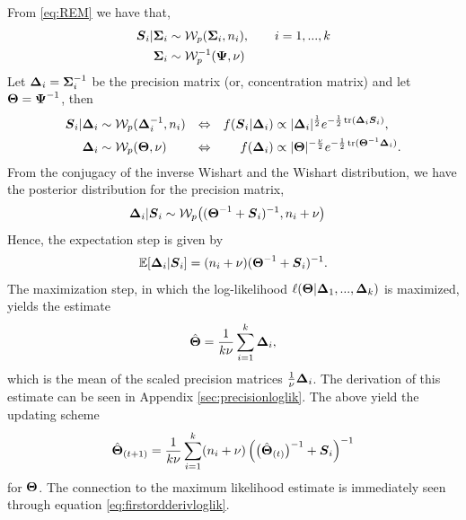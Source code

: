 \documentclass{article}\usepackage[]{graphicx}\usepackage[]{color}
\begin{document}
From \eqref{eq:REM} we have that,
\begin{align*}
  {\boldsymbol{S}}_i | {\boldsymbol{\Sigma}}_i  &\sim \mathcal{W}_p({\boldsymbol{\Sigma}}_i, n_i), \qquad i = 1, ..., k\\
  {\boldsymbol{\Sigma}}_i          &\sim \mathcal{W}_p^{-1}({\boldsymbol{\Psi}}, \nu)
\end{align*}
Let ${\boldsymbol{\Delta}}_i = {\boldsymbol{\Sigma}}_i^{-1}$ be the precision matrix (or, concentration matrix) and let ${\boldsymbol{\Theta}} = {\boldsymbol{\Psi}}^{-1}$, then
\begin{align}
%
  \vS_i | \vDelta_i
  &\sim \calW_p( \vDelta_i^{-1}, n_i)
  &\Leftrightarrow & &
  f(\vS_i | \vDelta_i)
  &\propto
      |\vDelta_i|^{\frac{1}{2}}
       e^{-\frac{1}{2}\tr(\vDelta_i\vS_i)},
  \label{eq:precisiondensity}
  \\
  \vDelta_i
  &\sim \calW_p(\vTheta, \nu)
  &\Leftrightarrow & &
  f(\vDelta_i)
  &\propto
       |\vTheta|^{-\frac{\nu}{2}}
       e^{-\frac{1}{2}\tr(\vTheta^{-1}\vDelta_i)}.
  \notag
\end{align}
From the conjugacy of the inverse Wishart and the Wishart distribution, we have the posterior distribution for the precision matrix,
\begin{align*}
    {\boldsymbol{\Delta}}_i | {\boldsymbol{S}}_i
    &\sim \mathcal{W}_p\!\left( ({\boldsymbol{\Theta}}^{-1} + {\boldsymbol{S}}_i)^{-1}, n_i + \nu\right)
\end{align*}
Hence, the expectation step is given by
\begin{align*}
  \mathbb{E}[{\boldsymbol{\Delta}}_i |{\boldsymbol{S}}_i] = (n_i + \nu)({\boldsymbol{\Theta}}^{-1} + {\boldsymbol{S}}_i)^{-1}.
\end{align*}
The maximization step, in which the log-likelihood $\ell({\boldsymbol{\Theta}}|{\boldsymbol{\Delta}}_1, ..., {\boldsymbol{\Delta}}_k)$ is maximized, yields the estimate
\begin{align*}
 \hat{{\boldsymbol{\Theta}}} = \frac{1}{k\nu}\sum_{i = 1}^k {\boldsymbol{\Delta}}_i,
\end{align*}
which is the mean of the scaled precision matrices $\frac{1}{\nu}{\boldsymbol{\Delta}}_i$.
The derivation of this estimate can be seen in Appendix \ref{sec:precisionloglik}.
The above yield the updating scheme
\begin{align}
  \label{eq:em}
  {\hat{\boldsymbol{\Theta}}}_{(t+1)}
  = \frac{1}{k\nu}\sum_{i = 1}^k
    (n_i + \nu)\left(\big({\hat{\boldsymbol{\Theta}}}_{(t)}\big)^{-1} + {\boldsymbol{S}}_i\right)^{-1}
\end{align}
for ${\boldsymbol{\Theta}}$. The connection to the maximum likelihood estimate is immediately seen through equation \eqref{eq:firstordderivloglik}.
\end{document}
